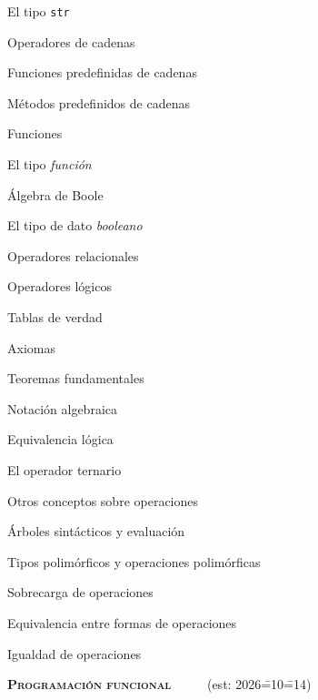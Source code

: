 \begin{longenum}
\begin{longenum}
\begin{longenum}
            \item El tipo \texttt{str}
            \item Operadores de cadenas
            \item Funciones predefinidas de cadenas
            \item Métodos predefinidos de cadenas
        \end{longenum}
        \item Funciones
        \begin{longenum}
            \item El tipo \textit{función}
        \end{longenum}
        \item Álgebra de Boole
        \begin{longenum}
            \item El tipo de dato \textit{booleano}
            \item Operadores relacionales
            \item Operadores lógicos
            \begin{longenum}
                \item Tablas de verdad
            \end{longenum}
            \item Axiomas
            \item Teoremas fundamentales
            \item Notación algebraica
            \item Equivalencia lógica
            \item El operador ternario
        \end{longenum}
        \item Otros conceptos sobre operaciones
        \begin{longenum}
            \item Árboles sintácticos y evaluación
            \item Tipos polimórficos y operaciones polimórficas
            \item Sobrecarga de operaciones
            \item Equivalencia entre formas de operaciones
            \item Igualdad de operaciones
        \end{longenum}
    \end{longenum}
    \item \textbf{\textsc{Programación funcional}} \ \ \ \ \ (est: 2026\==10\==14)

\end{longenum}
